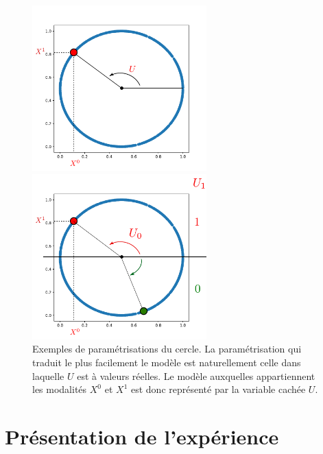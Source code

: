 \begin{figure}
\begin{minipage}{0.5\textwidth}
\centering
\includegraphics[width=0.6\textwidth]{cercle.pdf}
\end{minipage}
\begin{minipage}{0.5\textwidth}
\centering
\includegraphics[width=0.6\textwidth]{cercle_2.pdf}
\end{minipage}
\label{fig:U}
\caption{Exemples de paramétrisations du cercle. La paramétrisation qui traduit le plus facilement le modèle est naturellement celle dans laquelle $U$ est à valeurs réelles. Le modèle auxquelles appartiennent les modalités $X^0$ et $X^1$ est donc représenté par la variable cachée $U$.}
\end{figure}

\section{Présentation de l'expérience}

